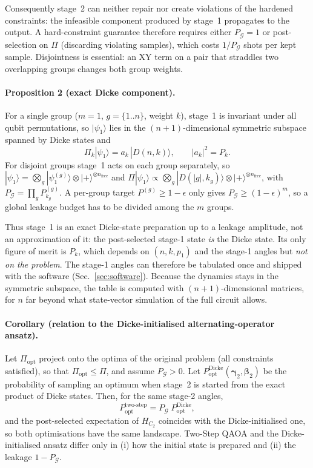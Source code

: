 Consequently stage~2 can neither repair nor create violations of the hardened constraints: the infeasible
component produced by stage~1 propagates to the output. A hard-constraint guarantee therefore
requires either $P_{\mathcal{G}}=1$ or post-selection on $\Pi$ (discarding violating samples),
which costs $1/P_{\mathcal{G}}$ shots per kept sample. Disjointness is essential: an XY term on a pair
that straddles two overlapping groups changes both group weights.

\paragraph{Proposition 2 (exact Dicke component).}
For a single group ($m=1$, $g=\{1..n\}$, weight $k$), stage~1 is invariant under all qubit permutations,
so $|\psi_1\rangle$ lies in the $(n+1)$-dimensional symmetric subspace spanned by Dicke states and
\begin{equation}
\Pi_k|\psi_1\rangle = a_k\,|D(n,k)\rangle,\qquad |a_k|^2=P_k .
\end{equation}
For disjoint groups stage~1 acts on each group separately, so $|\psi_1\rangle=\bigotimes_g|\psi_1^{(g)}\rangle\otimes|+\rangle^{\otimes n_{\mathrm{free}}}$
and $\Pi|\psi_1\rangle\propto\bigotimes_g|D(|g|,k_g)\rangle\otimes|+\rangle^{\otimes n_{\mathrm{free}}}$,
with $P_{\mathcal{G}}=\prod_g P_{k_g}^{(g)}$. A per-group target $P^{(g)}\ge 1-\epsilon$ only gives
$P_{\mathcal G}\ge(1-\epsilon)^m$, so a global leakage budget has to be divided among the $m$ groups.

Thus stage~1 is an exact Dicke-state preparation up to a leakage amplitude, not an approximation
of it: the post-selected stage-1 state \emph{is} the Dicke state. Its only figure of merit is $P_k$,
which depends on $(n,k,p_1)$ and the stage-1 angles but \emph{not on the problem}. The stage-1 angles
can therefore be tabulated once and shipped with the software (Sec.~\ref{sec:software}). Because the
dynamics stays in the symmetric subspace, the table is computed with $(n+1)$-dimensional matrices,
for $n$ far beyond what state-vector simulation of the full circuit allows.

\paragraph{Corollary (relation to the Dicke-initialised alternating-operator ansatz).}
Let $\Pi_{\mathrm{opt}}$ project onto the optima of the original problem (all constraints satisfied),
so that $\Pi_{\mathrm{opt}}\le\Pi$, and assume $P_{\mathcal G}>0$.
Let $P^{\mathrm{Dicke}}_{\mathrm{opt}}(\boldsymbol\gamma_2,\boldsymbol\beta_2)$ be the probability of sampling an optimum
when stage~2 is started from the exact product of Dicke states. Then, for the same stage-2 angles,
\begin{equation}
P^{\mathrm{two\text{-}step}}_{\mathrm{opt}} = P_{\mathcal{G}}\;P^{\mathrm{Dicke}}_{\mathrm{opt}},
\end{equation}
and the post-selected expectation of $H_{C_2}$ coincides with the Dicke-initialised one, so both
optimisations have the same landscape. Two-Step QAOA and the Dicke-initialised ansatz differ only
in (i) how the initial state is prepared and (ii) the leakage $1-P_{\mathcal{G}}$.

